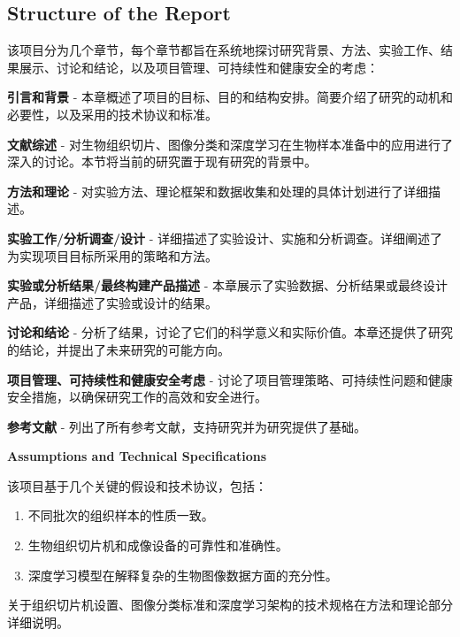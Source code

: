 \subsection{Structure of the Report}

该项目分为几个章节，每个章节都旨在系统地探讨研究背景、方法、实验工作、结果展示、讨论和结论，以及项目管理、可持续性和健康安全的考虑：

\textbf{引言和背景} - 本章概述了项目的目标、目的和结构安排。简要介绍了研究的动机和必要性，以及采用的技术协议和标准。

\textbf{文献综述} - 对生物组织切片、图像分类和深度学习在生物样本准备中的应用进行了深入的讨论。本节将当前的研究置于现有研究的背景中。

\textbf{方法和理论} - 对实验方法、理论框架和数据收集和处理的具体计划进行了详细描述。

\textbf{实验工作/分析调查/设计} - 详细描述了实验设计、实施和分析调查。详细阐述了为实现项目目标所采用的策略和方法。

\textbf{实验或分析结果/最终构建产品描述} - 本章展示了实验数据、分析结果或最终设计产品，详细描述了实验或设计的结果。

\textbf{讨论和结论} - 分析了结果，讨论了它们的科学意义和实际价值。本章还提供了研究的结论，并提出了未来研究的可能方向。

\textbf{项目管理、可持续性和健康安全考虑} - 讨论了项目管理策略、可持续性问题和健康安全措施，以确保研究工作的高效和安全进行。

\textbf{参考文献} - 列出了所有参考文献，支持研究并为研究提供了基础。


\textbf{Assumptions and Technical Specifications}

该项目基于几个关键的假设和技术协议，包括：

\begin{enumerate} 
    \item 不同批次的组织样本的性质一致。 
    \item 生物组织切片机和成像设备的可靠性和准确性。 
    \item 深度学习模型在解释复杂的生物图像数据方面的充分性。 
\end{enumerate}

关于组织切片机设置、图像分类标准和深度学习架构的技术规格在方法和理论部分详细说明。


